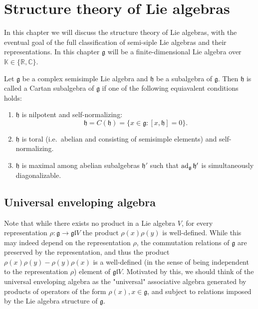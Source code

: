 \documentclass{report}
\begin{document}
\chapter{Structure theory of Lie algebras}
In this chapter we will discuss the structure theory of Lie algebras, with the eventual goal of the full classification of semi-siple Lie algebras and their representations.
In this chapter $\mathfrak g$ will be a finite-dimensional Lie algebra over $\mathbb K \in \{\mathbb R, \mathbb C\}$.
\begin{definition}
    Let $\mathfrak g$ be a complex semisimple Lie algebra and $\mathfrak h$ be a subalgebra of $\mathfrak g$.
    Then $\mathfrak h$ is called a Cartan subalgebra of $\mathfrak g$ if one of the following equiavalent conditions holds:
    \begin{enumerate}[label = (\roman*)]
        \item $\mathfrak h$ is nilpotent and self-normalizing:
        \[
        \mathfrak h = C(\mathfrak h) = \{x \in \mathfrak g : [x, \mathfrak h] = 0\}.
        \]
    \item $\mathfrak h$ is toral (i.e.\ abelian and consisting of semisimple elements) and self-normalizing.
    \item $\mathfrak h$ is maximal among abelian subalgebras $\mathfrak h'$ such that $\operatorname{ad}_{\mathfrak{g}}\mathfrak h'$ is simultaneously diagonalizable.
    \end{enumerate}
\end{definition}
\section{Universal enveloping algebra}
Note that while there exists no product in a Lie algebra $V$, for every representation $\rho: \mathfrak g \to \mathfrak{gl}{V}$ the product $\rho(x) \rho(y)$ is well-defined.
While this may indeed depend on the representation $\rho$, the commutation relations of $\mathfrak g$ are preserved by the representation, and thus the product $\rho(x) \rho(y) - \rho(y) \rho(x)$ is a well-defined (in the sense of being independent to the representation $\rho$) element of $\mathfrak{gl}{V}$.
Motivated by this, we should think of the universal enveloping algebra as the "universal" associative algebra generated by products of operators of the form $\rho(x), x \in \mathfrak g$, and subject to relations imposed by the Lie algebra structure of $\mathfrak g$.
\end{document}
